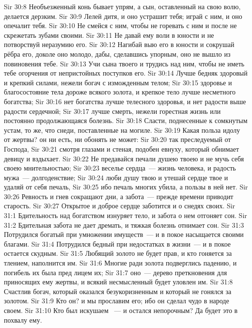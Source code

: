 \vs Sir 30:8 Необъезженный конь бывает упрям, а сын, оставленный на свою волю, делается дерзким.
\vs Sir 30:9 Лелей дитя, и оно устрашит тебя; играй с ним, и оно опечалит тебя.
\vs Sir 30:10 Не смейся с ним, чтобы не горевать с ним и после не скрежетать зубами своими.
\vs Sir 30:11 Не давай ему воли в юности и не потворствуй неразумию его.
\vs Sir 30:12 Нагибай выю его в юности и сокрушай рёбра его, доколе оно молодо, дабы, сделавшись упорным, оно не вышло из повиновения тебе.
\vs Sir 30:13 Учи сына твоего и трудись над ним, чтобы не иметь тебе огорчения от непристойных поступков его.
\rsbpar\vs Sir 30:14 Лучше бедняк здоровый и крепкий силами, нежели богач с изможденным телом;
\vs Sir 30:15 здоровье и благосостояние тела дороже всякого золота, и крепкое тело лучше несметного богатства;
\vs Sir 30:16 нет богатства лучше телесного здоровья, и нет радости выше радости сердечной;
\vs Sir 30:17 лучше смерть, нежели горестная жизнь или постоянно продолжающаяся болезнь.
\vs Sir 30:18 Сласти, поднесенные к сомкнутым устам, то же, что снеди, поставленные на могиле.
\vs Sir 30:19 Какая польза идолу от жертвы? он ни есть, ни обонять не может:
\vs Sir 30:20 так преследуемый от Господа,
\vs Sir 30:21 смотря глазами и стеная, подобен евнуху, который обнимает девицу и вздыхает.
\vs Sir 30:22 Не предавайся печали душею твоею и не мучь себя своею мнительностью;
\vs Sir 30:23 веселье сердца~--- жизнь человека, и радость мужа~--- долгоденствие;
\vs Sir 30:24 люби душу твою и утешай сердце твое и удаляй от себя печаль,
\vs Sir 30:25 ибо печаль многих убила, а пользы в ней нет.
\vs Sir 30:26 Ревность и гнев сокращают дни, а забота~--- прежде времени приводит старость.
\vs Sir 30:27 Открытое и доброе сердце заботится и о снедях своих.
\vs Sir 31:1 Бдительность над богатством изнуряет тело, и забота о нем отгоняет сон.
\vs Sir 31:2 Бдительная забота не дает дремать, и тяжкая болезнь отнимает сон.
\vs Sir 31:3 Потрудился богатый при умножении имуществ~--- и в покое насыщается своими благами.
\vs Sir 31:4 Потрудился бедный при недостатках в жизни~--- и в покое остается скудным.
\vs Sir 31:5 Любящий золото не будет прав, и кто гоняется за тлением, наполнится им.
\vs Sir 31:6 Многие ради золота подверглись падению, и погибель их была пред лицем их;
\vs Sir 31:7 оно~--- дерево преткновения для приносящих ему жертвы, и всякий несмысленный будет уловлен им.
\vs Sir 31:8 Счастлив богач, который оказался безукоризненным и который не гонялся за золотом.
\vs Sir 31:9 Кто он? и мы прославим его; ибо он сделал чудо в народе своем.
\vs Sir 31:10 Кто был искушаем ~--- и остался непорочным? Да будет это в похвалу ему.
